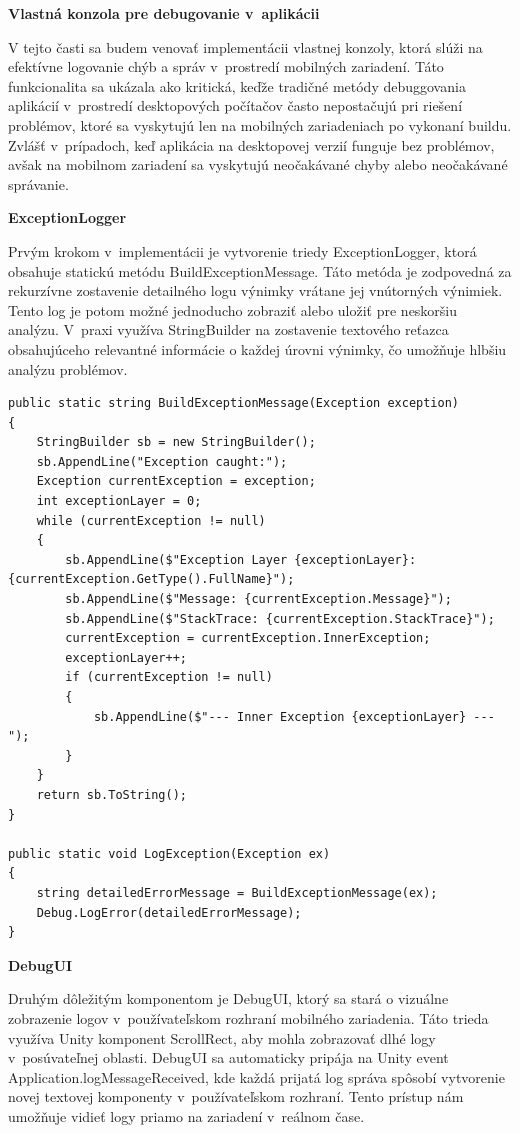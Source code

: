 {\large\textbf{Vlastná konzola pre debugovanie v~aplikácii}}

V tejto časti sa budem venovať implementácii vlastnej konzoly, ktorá slúži na efektívne logovanie chýb a správ v~prostredí mobilných zariadení. Táto funkcionalita sa ukázala ako kritická, keďže tradičné metódy debuggovania aplikácií v~prostredí desktopových počítačov často nepostačujú pri riešení problémov, ktoré sa vyskytujú len na mobilných zariadeniach po vykonaní buildu. Zvlášť v~prípadoch, keď aplikácia na desktopovej verzií funguje bez problémov, avšak na mobilnom zariadení sa vyskytujú neočakávané chyby alebo neočakávané správanie.

{\normalsize\textbf{ExceptionLogger}}

Prvým krokom v~implementácii je vytvorenie triedy ExceptionLogger, ktorá obsahuje statickú metódu BuildExceptionMessage. Táto metóda je zodpovedná za rekurzívne zostavenie detailného logu výnimky vrátane jej vnútorných výnimiek. Tento log je potom možné jednoducho zobraziť alebo uložiť pre neskoršiu analýzu. V~praxi využíva StringBuilder na zostavenie textového reťazca obsahujúceho relevantné informácie o každej úrovni výnimky, čo umožňuje hlbšiu analýzu problémov.

\lstset{style=Csharp}
\begin{lstlisting}[caption={ExceptionLogger Class - Vytvorenie custom debug správy}, label=exceptionLogger]
public static string BuildExceptionMessage(Exception exception)
{
    StringBuilder sb = new StringBuilder();
    sb.AppendLine("Exception caught:");
    Exception currentException = exception;
    int exceptionLayer = 0; 
    while (currentException != null)
    {
        sb.AppendLine($"Exception Layer {exceptionLayer}: {currentException.GetType().FullName}");
        sb.AppendLine($"Message: {currentException.Message}");
        sb.AppendLine($"StackTrace: {currentException.StackTrace}");
        currentException = currentException.InnerException;
        exceptionLayer++;
        if (currentException != null)
        {
            sb.AppendLine($"--- Inner Exception {exceptionLayer} ---");
        }
    }
    return sb.ToString();
}

public static void LogException(Exception ex)
{
    string detailedErrorMessage = BuildExceptionMessage(ex);
    Debug.LogError(detailedErrorMessage);
}
\end{lstlisting} 

{\normalsize\textbf{DebugUI}}

Druhým dôležitým komponentom je DebugUI, ktorý sa stará o vizuálne zobrazenie logov v~používateľskom rozhraní mobilného zariadenia. Táto trieda využíva Unity komponent ScrollRect, aby mohla zobrazovať dlhé logy v~posúvateľnej oblasti. DebugUI sa automaticky pripája na Unity event Application.logMessageReceived, kde každá prijatá log správa spôsobí vytvorenie novej textovej komponenty v~používateľskom rozhraní. Tento prístup nám umožňuje vidieť logy priamo na zariadení v~reálnom čase.

